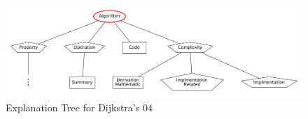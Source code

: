 \begin{figure}[t]
  \includegraphics[scale=0.5, trim={0.2cm 0.5cm 0.5cm 0.5cm},clip]{DJK_tree}
\caption{Explanation Tree for Dijkstra's 04}
\label{fig:djk-tree}
\end{figure}